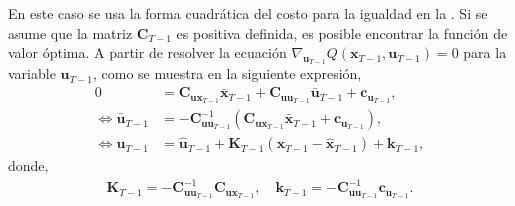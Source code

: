 En este caso se usa la forma cuadrática del costo para la igualdad en la . Si se asume que la matriz $\mathbf{C}_{T-1}$ es positiva definida, es posible encontrar la función de valor óptima. A partir de resolver la ecuación $\nabla_{\mathbf{u}_{T-1}}Q(\mathbf{x}_{T-1}, \mathbf{u}_{T-1})=0$ para la variable $\mathbf{u}_{T-1}$, como se muestra en la siguiente expresión,
\begin{equation}
    \begin{aligned}
       0 &= \mathbf{C}_{\mathbf{u}\mathbf{x}_{T-1}}\bar{\mathbf{x}}_{T-1}
    + \mathbf{C}_{\mathbf{u}\mathbf{u}_{T-1}}\bar{\mathbf{u}}_{T-1}
    + \mathbf{c}_{\mathbf{u}_{T-1}}, \\
    \iff \bar{\mathbf{u}}_{T-1} &= -\mathbf{C}_{\mathbf{u}\mathbf{u}_{T-1}}^{-1}(\mathbf{C}_{\mathbf{u}\mathbf{x}_{T-1}}\bar{\mathbf{x}}_{T-1} + \mathbf{c}_{\mathbf{u}_{T-1}}), \\
    \iff \mathbf{u}_{T-1} &= \hat{\mathbf{u}}_{T-1} + \mathbf{K}_{T-1}(\mathbf{x}_{T-1} - \hat{\mathbf{x}}_{T-1}) + \mathbf{k}_{T-1},
    \end{aligned}
\end{equation}
donde, 
\begin{align}
    \mathbf{K}_{T-1} = -\textbf{C}_{\mathbf{u} \mathbf{u}_{T-1}}^{-1}\mathbf{C}_{\mathbf{u}\mathbf{x}_{T-1}}, \quad \mathbf{k}_{T-1}= -\mathbf{C}_{\mathbf{u} \mathbf{u}_{T-1}}^{-1}\mathbf{c}_{\mathbf{u}_{T-1}}.
\end{align} 

